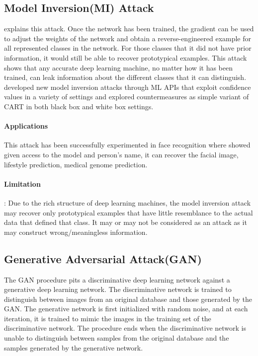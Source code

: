 \documentclass[a4paper]{article}
\begin{document}
\subsection{Model Inversion(MI) Attack}
\cite{wang2016learning} explains this attack. Once the network has been trained, the gradient can be used to adjust the weights of the network and obtain a reverse-engineered example for all represented classes in the network. For those classes that it did not have prior information, it would still be able to recover prototypical examples. This attack shows that any accurate deep learning machine, no matter how it has been trained, can leak information about the different classes that it can distinguish.
\cite{fredrikson2015model} developed new model inversion attacks through ML APIs that exploit confidence values in a variety of settings and explored countermeasures as simple variant of CART in both black box and white box settings.

\paragraph{Applications} This attack has been successfully experimented in face recognition where \cite{fredrikson2015model} showed given access to the model and person's name, it can recover the facial image, lifestyle prediction, medical genome prediction.

\paragraph{Limitation}: Due to the rich structure of deep learning machines, the model inversion attack may recover only prototypical examples that have little resemblance to the actual data that defined that class. It may or may not be considered as an attack as it may construct wrong/meaningless information.
 
\subsection{Generative Adversarial Attack(GAN)} 
The GAN procedure pits a discriminative deep learning network against a generative deep learning network. The discriminative network is trained to distinguish between images from an original database and those generated by the GAN. The generative network is first initialized with random noise, and at each iteration, it is trained to mimic the images in the training set of the discriminative network. The procedure ends when the discriminative network is unable to distinguish between samples from the original database and the samples generated by the generative network.
\end{document}

